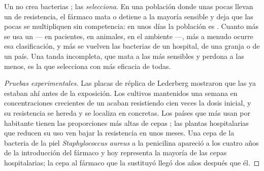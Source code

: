 \begin{proposition}\label{prop:g11:antibiotic-resistance:selection}
Un  no crea bacterias ; las
\emph{selecciona}. En una población donde unas pocas  llevan un
 de resistencia, el fármaco mata o detiene a la mayoría sensible y
deja que las pocas  se multipliquen sin competencia: en
unos días la población es . Cuanto más se usa un 
--- en pacientes, en animales, en el ambiente ---, más a menudo ocurre
esa clasificación, y más  se vuelven las bacterias de un
hospital, de una granja o de un país. Una tanda incompleta, que mata a
las  más sensibles y perdona a las menos, es la que selecciona
con más eficacia de todas.
\end{proposition}
\begin{proof}[Pruebas experimentales]
Las placas de réplica de Lederberg mostraron que las 
 ya estaban ahí antes de la exposición. Los cultivos
mantenidos una semana en concentraciones crecientes de un 
acaban resistiendo cien veces la dosis inicial, y su resistencia se
hereda y se localiza en  concretas. Los países que más
 usan por habitante tienen las proporciones más altas de
cepas ; las plantas hospitalarias que reducen su uso ven
bajar la resistencia en unos meses. Una cepa de la bacteria de la piel
\emph{Staphylococcus aureus}  a la penicilina apareció a los
cuatro años de la introducción del fármaco y hoy representa la mayoría
de las cepas hospitalarias; la cepa  al fármaco que la
sustituyó llegó dos años después que él.
\end{proof}

